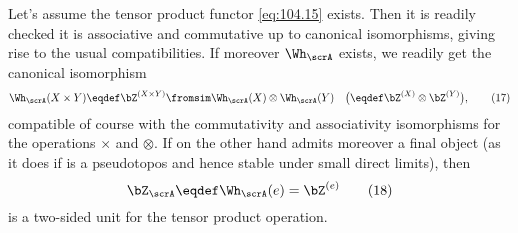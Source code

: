 Let's assume the tensor product functor \eqref{eq:104.15} exists. Then
it is readily checked it is associative and commutative up to
canonical isomorphisms, giving rise to the usual compatibilities. If
moreover $\Wh_\scrA$ exists, we readily get the canonical isomorphism
\begin{equation}
  \label{eq:104.17}
  \Wh_\scrA(X\times Y)\eqdef\bZ^{(X\times Y)} \fromsim
  \Wh_\scrA(X)\otimes \Wh_\scrA(Y)\quad \bigl(\eqdef
  \bZ^{(X)}\otimes\bZ^{(Y)}\bigr),\tag{17} 
\end{equation}
compatible of course with the commutativity and associativity
isomorphisms for the operations $\times$ and $\otimes$. If on the
other hand \scrA{} admits moreover a final object (as it does if
\scrA{} is a pseudotopos and hence stable under small direct limits),
then
\begin{equation}
  \label{eq:104.18}
  \bZ_\scrA \eqdef \Wh_\scrA(e) = \bZ^{(e)}\tag{18}
\end{equation}
is a two-sided unit for the tensor product operation.

